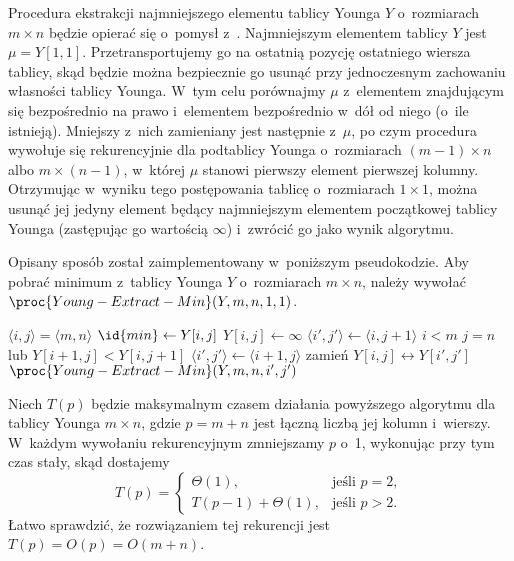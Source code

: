 \subproblem %
Procedura ekstrakcji najmniejszego elementu tablicy Younga $Y$ o~rozmiarach $m\times n$ będzie opierać się o~pomysł z~. Najmniejszym elementem tablicy $Y$ jest $\mu=Y[1,1]$. Przetransportujemy go na ostatnią pozycję ostatniego wiersza tablicy, skąd będzie można bezpiecznie go usunąć przy jednoczesnym zachowaniu własności tablicy Younga. W~tym celu porównajmy $\mu$ z~elementem znajdującym się bezpośrednio na prawo i~elementem bezpośrednio w~dół od niego (o~ile istnieją). Mniejszy z~nich zamieniany jest następnie z~$\mu$, po czym procedura wywołuje się rekurencyjnie dla podtablicy Younga o~rozmiarach $(m-1)\times n$ albo $m\times(n-1)$, w~której $\mu$ stanowi pierwszy element pierwszej kolumny. Otrzymując w~wyniku tego postępowania tablicę o~rozmiarach $1\times1$, można usunąć jej jedyny element będący najmniejszym elementem początkowej tablicy Younga (zastępując go wartością $\infty$) i~zwrócić go jako wynik algorytmu.

Opisany sposób został zaimplementowany w~poniższym pseudokodzie. Aby pobrać minimum z~tablicy Younga $Y$ o~rozmiarach $m\times n$, należy wywołać $\proc{Young-Extract-Min}(Y,m,n,1,1)$.
\begin{codebox}
\li	\If $\langle i,j\rangle=\langle m,n\rangle$
\li		\Then
			$\id{min}\gets Y[i,j]$
\li			$Y[i,j]\gets\infty$
\li			\Return {}
		\End
\li	$\langle i',j'\rangle\gets\langle i,j+1\rangle$
\li	\If $i<m$
\li		\Then
			\If $j=n$ lub $Y[i+1,j]<Y[i,j+1]$
\li				\Then $\langle i',j'\rangle\gets\langle i+1,j\rangle$
				\End
		\End
\li	zamień $Y[i,j]\leftrightarrow Y[i',j']$
\li	\Return $\proc{Young-Extract-Min}(Y,m,n,i',j')$
\end{codebox}

Niech $T(p)$ będzie maksymalnym czasem działania powyższego algorytmu dla tablicy Younga $m\times n$, gdzie $p=m+n$ jest łączną liczbą jej kolumn i~wierszy. W~każdym wywołaniu rekurencyjnym zmniejszamy $p$ o~1, wykonując przy tym czas stały, skąd dostajemy
\[
	T(p) =
	\begin{cases}
		\Theta(1), & \text{jeśli $p=2$}, \\
		T(p-1)+\Theta(1), & \text{jeśli $p>2$}.
	\end{cases}
\]
Łatwo sprawdzić, że rozwiązaniem tej rekurencji jest $T(p)=O(p)=O(m+n)$.

